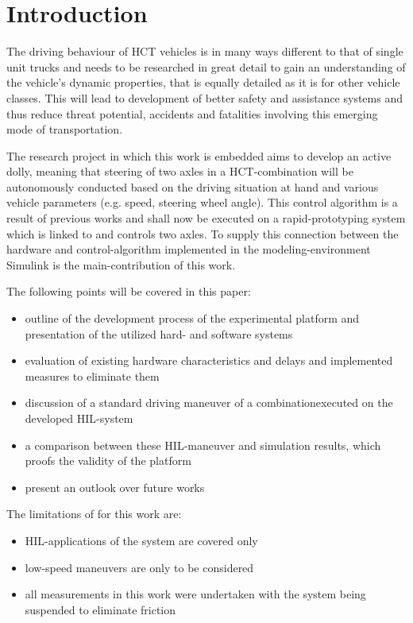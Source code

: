 \documentclass[root.tex]{subfiles}
\begin{document}
{\pagestyle{empty}}
\section{Introduction}
\label{chap:introduction}
The driving behaviour of \gls{HCT} vehicles is in many ways different to that of single unit trucks and needs to be researched in great detail to gain an understanding of the vehicle's dynamic properties, that is equally detailed as it is for other vehicle classes. This will lead to development of better safety and assistance systems and thus reduce threat potential, accidents and fatalities involving this emerging mode of transportation. 

The research project in which this work is embedded aims to develop an active dolly, meaning that steering of two axles in a \gls{HCT}-combination will be autonomously conducted based on the driving situation at hand and various vehicle parameters (e.g. speed, steering wheel angle).
This control algorithm is a result of previous works and shall now be executed on a rapid-prototyping system which is linked to and controls two axles. To supply this connection between the hardware and control-algorithm implemented in the modeling-environment Simulink is the main-contribution of this work. 


The following points will be covered in this paper:
\begin{itemize}
	\item outline of the development process of the experimental platform and presentation of the utilized hard- and software systems 
	\item evaluation of existing hardware characteristics and delays and implemented measures to eliminate them
	\item discussion of a standard driving maneuver of a combinationexecuted on the  developed \gls{HIL}-system 
	\item a comparison between these \gls{HIL}-maneuver and simulation results, which proofs the validity of the platform
	\item present an outlook over future works
\end{itemize}

The limitations of for this work are: 

\begin{itemize}
	\item \gls{HIL}-applications of the system are covered only
	\item low-speed maneuvers are only to be considered
	\item all measurements in this work were undertaken with the system being suspended to eliminate friction
\end{itemize}
\end{document}

